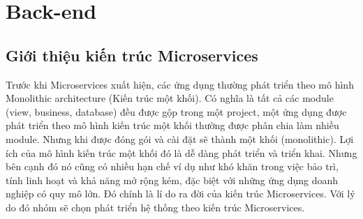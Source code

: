\section{Back-end}
        \subsection{Giới thiệu kiến trúc Microservices}
        Trước khi Microservices \cite{Microservices} xuất hiện, các ứng dụng thường phát triển theo mô hình Monolithic architecture (Kiến trúc một khối). Có nghĩa là tất cả các module (view, business, database) đều được gộp trong một project, một ứng dụng được phát triển theo mô hình kiến trúc một khối thường được phân chia làm nhiều module. Nhưng khi được đóng gói và cài đặt sẽ thành một khối (monolithic). Lợi ích của mô hình kiến trúc một khối đó là dễ dàng phát triển và triển khai. Nhưng bên cạnh đó nó cũng có nhiều hạn chế ví dụ như khó khăn trong việc bảo trì, tính linh hoạt và khả năng mở rộng kém, đặc biệt với những ứng dụng doanh nghiệp có quy mô lớn. Đó chính là lí do ra đời của kiến trúc Microservices. Với lý do đó nhóm sẽ chọn phát triển hệ thống theo kiến trúc Microservices.
